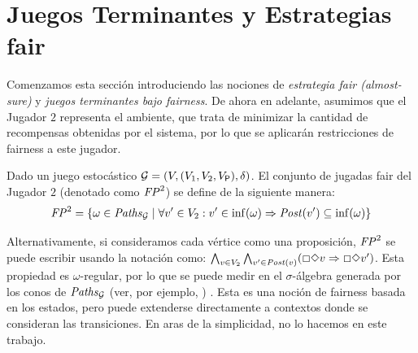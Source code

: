 \section{Juegos Terminantes y Estrategias fair}\label{sec:stopping_fair}

Comenzamos esta sección introduciendo las nociones de \emph{estrategia fair (almost-sure)} y \emph{juegos terminantes bajo fairness}. 
De ahora en adelante, asumimos que el Jugador $2$ representa el ambiente, que trata de minimizar la cantidad de recompensas obtenidas por el sistema, por lo que se aplicarán restricciones de fairness a este jugador.

\begin{definition}
Dado un juego estocástico $\mathcal{G} = (V, (V_1, V_2, V_{\mathsf{P}}), \delta)$.
El conjunto de jugadas fair del Jugador $2$ (denotado como $\mathit{FP}^2$) se define de la siguiente manera:
\[
	\mathit{FP}^2 = \{ \omega \in \mathit{Paths}_{\mathcal{G}} \mid \forall v' \in V_2: v' \in \inf(\omega)  \Rightarrow \mathit{Post}(v') \subseteq \inf(\omega) \}
\]
\end{definition}
Alternativamente, si consideramos cada vértice como una proposición, $\mathit{FP}^2$ se puede escribir usando la notación {\LTL} como:
$\bigwedge_{v \in V_2} \bigwedge_{v' \in \mathit{Post}(v)}(\Box \Diamond v \Rightarrow \Box \Diamond v')$. Esta propiedad es $\omega$-regular, por lo que se puede medir en el $\sigma$-álgebra generada por los conos de $\mathit{Paths}_{\mathcal{G}}$ (ver, por ejemplo, \cite[p.804]{BaierK08}) . Esta es una noción de fairness basada en los estados, pero puede extenderse directamente a contextos donde se consideran las transiciones. En aras de la simplicidad, no lo hacemos en este trabajo.
	
